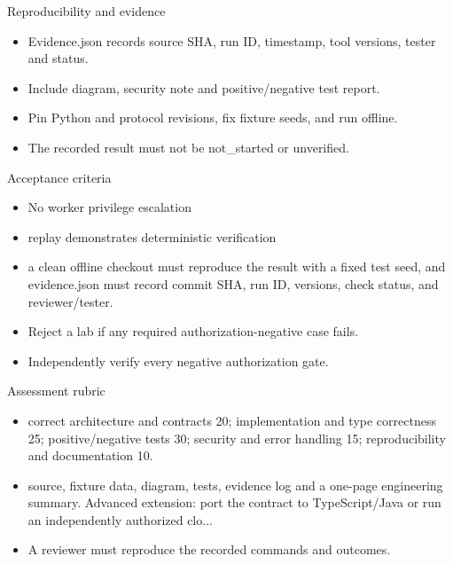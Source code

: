\documentclass[aspectratio=169,10pt]{beamer}
\begin{document}
\begin{frame}{Reproducibility and evidence}
\small
\begin{itemize}
\item Evidence.json records source SHA, run ID, timestamp, tool versions, tester and status.
\item Include diagram, security note and positive/negative test report.
\item Pin Python and protocol revisions, fix fixture seeds, and run offline.
\item The recorded result must not be not\_started or unverified.
\end{itemize}

\end{frame}

\begin{frame}{Acceptance criteria}
\small
\begin{itemize}
\item No worker privilege escalation
\item replay demonstrates deterministic verification
\item a clean offline checkout must reproduce the result with a fixed test seed, and evidence.json must record commit SHA, run ID, versions, check status, and reviewer/tester.
\item Reject a lab if any required authorization-negative case fails.
\item Independently verify every negative authorization gate.
\end{itemize}

\end{frame}

\begin{frame}{Assessment rubric}
\small
\begin{itemize}
\item correct architecture and contracts 20; implementation and type correctness 25; positive/negative tests 30; security and error handling 15; reproducibility and documentation 10.
\item source, fixture data, diagram, tests, evidence log and a one-page engineering summary. Advanced extension: port the contract to TypeScript/Java or run an independently authorized clo...
\item A reviewer must reproduce the recorded commands and outcomes.
\end{itemize}

\end{frame}
\end{document}
